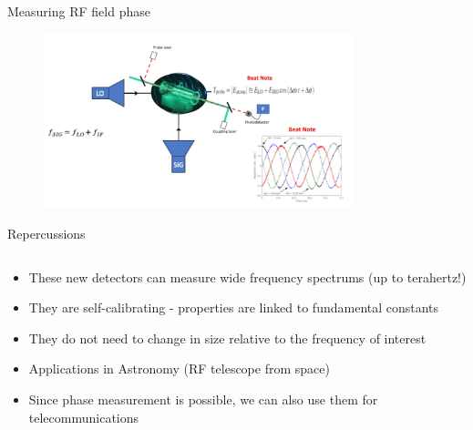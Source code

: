 \begin{frame}{Measuring RF field phase}
    \begin{figure}
        \centering
        \includegraphics[width=0.8\textwidth]{images/rydberg_phase_measurement.png}
    \end{figure}
\end{frame}

\begin{columnframe}{Repercussions}
    \begin{column}{0.9\textwidth}
        \begin{itemize}
            \item These new detectors can measure wide frequency spectrums (up to terahertz!)
            \item They are self-calibrating - properties are linked to fundamental constants
            \item They do not need to change in size relative to the frequency of interest
            \item Applications in Astronomy (RF telescope from space)
            \item Since phase measurement is possible, we can also use them for telecommunications
        \end{itemize}
    \end{column}
\end{columnframe}

